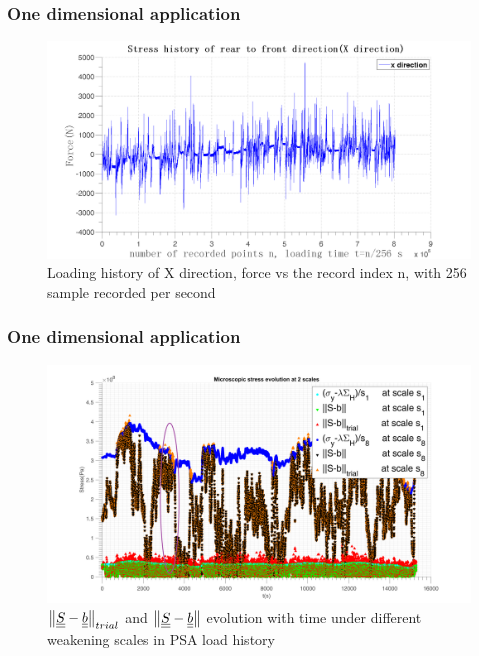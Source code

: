 \documentclass[xcolor=table]{Bredelebeamer}
\begin{document}
\begin{frame}
	\frametitle{One dimensional application}
\begin{figure}[!h]
	\centering
	\includegraphics[width=\textwidth]{figures//x.png} 
	\caption{Loading history of X direction, force vs the record index n, with 256 sample recorded per second}
	\label{x}
\end{figure}
\end{frame}	


\begin{frame}
	\frametitle{One dimensional application}
\begin{figure}[!h]
	\centering
	\includegraphics[width=\textwidth]{figures//trialreal1d1.png} 
	\caption{$\left\|  \uline{\uline{S}}-\uline{\uline{b}}\right\| _{trial}$ and $\left\| \uline{\uline{S}}-\uline{\uline{b}}\right\|$ evolution with time under different weakening scales in PSA load history}
	\label{trialreal}
\end{figure}
\end{frame}	
\end{document}
